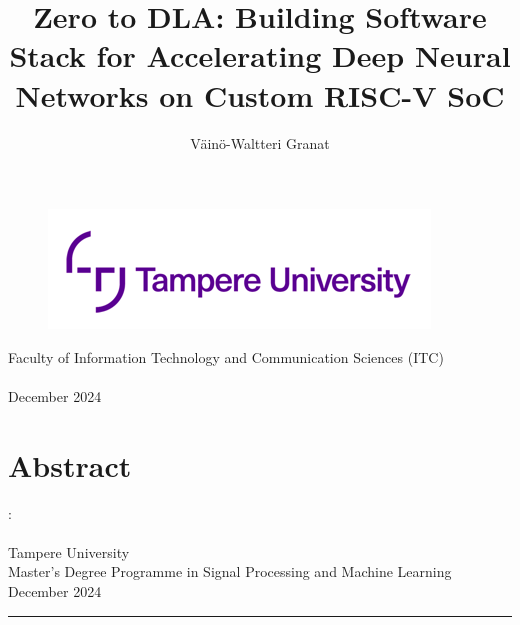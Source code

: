 \documentclass[12pt,a4paper,finnish
]{tunithesis}
\author{Väinö-Waltteri Granat}
\title{Zero to DLA: Building Software Stack for Accelerating Deep Neural Networks on Custom RISC-V SoC} %
\begin{document}
\makeatletter

\thispagestyle{empty}
\vspace*{-.5cm}\noindent

\begin{figure}
    \vspace{-1.3cm}
    \advance\leftskip-2.5cm
    \noindent\includegraphics{img/tunilogo.png}
\end{figure}
 
\vspace{2.5cm}
\begin{flushright}
\noindent\textsf{\LARGE{\@author}}

\noindent\vspace{0.5cm}

\noindent\Huge{\textsf{\textbf{\textcolor{tunipurple}{\@title}}}}
\end{flushright}
\vspace{10.7cm} %

\begin{flushright}  
    \begin{spacing}{1.0}
      \textsf{Faculty of Information Technology and Communication Sciences (ITC)\\
      \@thesistype\\
      December 2024}
    \end{spacing}
\end{flushright}

\if@twoside
\clearpage
\fi

%


\chapter*{Abstract}

\begin{spacing}{1.0}
\noindent \@author: \@title\\
\@thesistype\\
Tampere University\\
Master’s Degree Programme in Signal Processing and Machine Learning\\
December 2024
\end{spacing}
\noindent\rule{12cm}{0.4pt}
\end{document}
